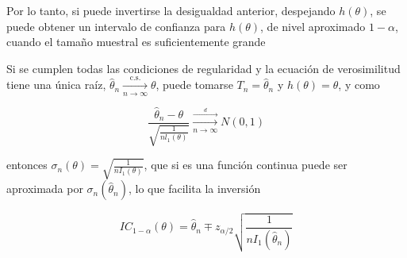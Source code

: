 Por lo tanto, si puede invertirse la desigualdad anterior, despejando
$h(\theta)$, se puede obtener un intervalo de confianza para $h(\theta)$, de
nivel aproximado $1-\alpha$, cuando el tamaño muestral es suficientemente
grande

\begin{observación}
Si se cumplen todas las condiciones de regularidad y la ecuación de verosimilitud tiene una única raíz, $\hat{\theta}_{n} \xrightarrow[n \rightarrow \infty]{\text { c.s. }} \theta$, puede tomarse $T_{n}=\hat{\theta}_{n}$ y $h(\theta)=\theta$, y como

$$
    \frac{\hat{\theta}_{n}-\theta}{\sqrt{\frac{1}{n l_{1}(\theta)}}} \xrightarrow[n \rightarrow \infty]{\stackrel{d}{\longrightarrow}} N(0,1)
$$

entonces $\sigma_{n}(\theta)=\sqrt{\frac{1}{n I_{1}(\theta)}}$, que si es una
función continua puede ser aproximada por
$\sigma_{n}\left(\hat{\theta}_{n}\right)$, lo que facilita la inversión

$$
    I C_{1-\alpha}(\theta)=\hat{\theta}_{n} \mp z_{\alpha / 2} \sqrt{\frac{1}{n I_{1}\left(\hat{\theta}_{n}\right)}}
$$
\end{observación}



